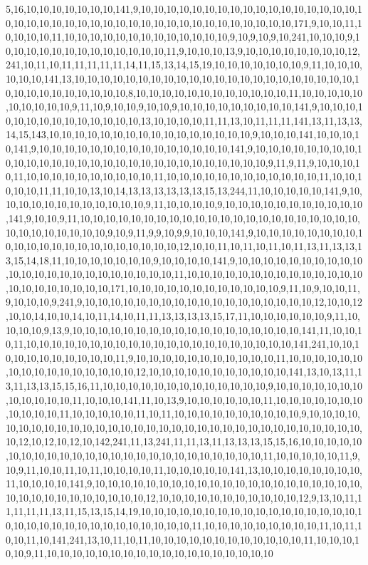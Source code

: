5,16,10,10,10,10,10,10,10,141,9,10,10,10,10,10,10,10,10,10,10,10,10,10,10,10,10,10,10,10,10,10,10,10,10,10,10,10,10,10,10,10,10,10,10,10,10,10,10,10,10,171,9,10,10,11,10,10,10,10,11,10,10,10,10,10,10,10,10,10,10,10,10,10,9,10,9,10,9,10,241,10,10,10,9,10,10,10,10,10,10,10,10,10,10,10,10,10,11,9,10,10,10,13,9,10,10,10,10,10,10,10,10,12,241,10,11,10,11,11,11,11,11,14,11,15,13,14,15,19,10,10,10,10,10,10,10,9,11,10,10,10,10,10,10,141,13,10,10,10,10,10,10,10,10,10,10,10,10,10,10,10,10,10,10,10,10,10,10,10,10,10,10,10,10,10,10,10,10,8,10,10,10,10,10,10,10,10,10,10,10,10,11,10,10,10,10,10,10,10,10,10,10,9,11,10,9,10,10,9,10,10,9,10,10,10,10,10,10,10,10,10,141,9,10,10,10,10,10,10,10,10,10,10,10,10,10,10,13,10,10,10,10,11,11,13,10,11,11,11,141,13,11,13,13,14,15,143,10,10,10,10,10,10,10,10,10,10,10,10,10,10,10,10,9,10,10,10,141,10,10,10,10,141,9,10,10,10,10,10,10,10,10,10,10,10,10,10,10,10,141,9,10,10,10,10,10,10,10,10,10,10,10,10,10,10,10,10,10,10,10,10,10,10,10,10,10,10,10,10,10,9,11,9,11,9,10,10,10,10,11,10,10,10,10,10,10,10,10,10,10,11,10,10,10,10,10,10,10,10,10,10,10,10,11,10,10,10,10,10,11,11,10,10,13,10,14,13,13,13,13,13,13,15,13,244,11,10,10,10,10,10,141,9,10,10,10,10,10,10,10,10,10,10,10,10,9,11,10,10,10,10,9,10,10,10,10,10,10,10,10,10,10,10,141,9,10,10,9,11,10,10,10,10,10,10,10,10,10,10,10,10,10,10,10,10,10,10,10,10,10,10,10,10,10,10,10,10,10,10,9,10,9,11,9,9,10,9,9,10,10,10,141,9,10,10,10,10,10,10,10,10,10,10,10,10,10,10,10,10,10,10,10,10,10,10,12,10,10,11,10,11,10,11,10,11,13,11,13,13,13,15,14,18,11,10,10,10,10,10,10,10,9,10,10,10,10,141,9,10,10,10,10,10,10,10,10,10,10,10,10,10,10,10,10,10,10,10,10,10,10,10,11,10,10,10,10,10,10,10,10,10,10,10,10,10,10,10,10,10,10,10,10,10,10,171,10,10,10,10,10,10,10,10,10,10,10,10,9,11,10,9,10,10,11,9,10,10,10,9,241,9,10,10,10,10,10,10,10,10,10,10,10,10,10,10,10,10,10,10,12,10,10,12,10,10,14,10,10,14,10,11,14,10,11,11,13,13,13,13,15,17,11,10,10,10,10,10,10,9,11,10,10,10,10,9,13,9,10,10,10,10,10,10,10,10,10,10,10,10,10,10,10,10,10,10,141,11,10,10,10,11,10,10,10,10,10,10,10,10,10,10,10,10,10,10,10,10,10,10,10,10,10,141,241,10,10,10,10,10,10,10,10,10,10,10,11,9,10,10,10,10,10,10,10,10,10,10,10,11,10,10,10,10,10,10,10,10,10,10,10,10,10,10,10,10,12,10,10,10,10,10,10,10,10,10,10,10,141,13,10,13,11,13,11,13,13,15,15,16,11,10,10,10,10,10,10,10,10,10,10,10,10,10,9,10,10,10,10,10,10,10,10,10,10,10,10,11,10,10,10,141,11,10,13,9,10,10,10,10,10,10,11,10,10,10,10,10,10,10,10,10,10,10,11,10,10,10,10,10,11,10,11,10,10,10,10,10,10,10,10,10,10,9,10,10,10,10,10,10,10,10,10,10,10,10,10,10,10,10,10,10,10,10,10,10,10,10,10,10,10,10,10,10,10,10,10,12,10,12,10,12,10,142,241,11,13,241,11,11,13,11,13,13,13,15,15,16,10,10,10,10,10,10,10,10,10,10,10,10,10,10,10,10,10,10,10,10,10,10,10,10,10,11,10,10,10,10,10,11,9,10,9,11,10,10,11,10,11,10,10,10,10,11,10,10,10,10,10,141,13,10,10,10,10,10,10,10,10,11,10,10,10,10,141,9,10,10,10,10,10,10,10,10,10,10,10,10,10,10,10,10,10,10,10,10,10,10,10,10,10,10,10,10,10,10,10,10,12,10,10,10,10,10,10,10,10,10,10,10,12,9,13,10,11,11,11,11,11,13,11,15,13,15,14,19,10,10,10,10,10,10,10,10,10,10,10,10,10,10,10,10,10,10,10,10,10,10,10,10,10,10,10,10,10,10,10,10,11,10,10,10,10,10,10,10,10,10,11,10,11,10,10,11,10,141,241,13,10,11,10,11,10,10,10,10,10,10,10,10,10,10,10,10,11,10,10,10,10,10,9,11,10,10,10,10,10,10,10,10,10,10,10,10,10,10,10,10,10,10